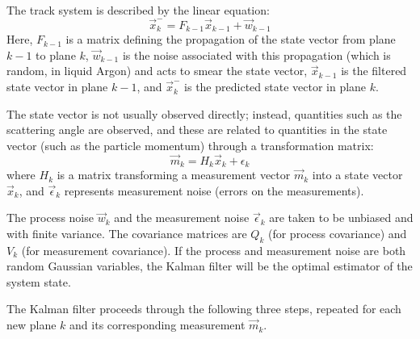 The track system is described by the linear equation:
\begin{equation}\label{eqn:kalman_track_system}
    \vec{x}_k^{-} = F_{k-1} \vec{x}_{k-1} + \vec{w}_{k-1}
\end{equation}
Here, $F_{k-1}$ is a matrix defining the propagation of the state vector from plane $k-1$ to plane $k$, $\vec{w}_{k-1}$ is the noise associated with this propagation (which is random, in liquid Argon) and acts to smear the state vector, $\vec{x}_{k-1}$ is the filtered state vector in plane $k-1$, and $\vec{x}_k^{-}$ is the predicted state vector in plane $k$.

The state vector is not usually observed directly; instead, quantities such as the scattering angle are observed, and these are related to quantities in the state vector (such as the particle momentum) through a transformation matrix:
\begin{equation}\label{eqn:kalman_measurement_equation}
    \vec{m}_k = H_k \vec{x}_k + \epsilon_k
\end{equation}
where $H_k$ is a matrix transforming a measurement vector $\vec{m}_k$ into a state vector $\vec{x}_k$, and $\vec{\epsilon}_k$ represents measurement noise (errors on the measurements).

The process noise $\vec{w}_k$ and the measurement noise $\vec{\epsilon}_k$ are taken to be unbiased and with finite variance. The covariance matrices are $Q_k$ (for process covariance) and $V_k$ (for measurement covariance). If the process and measurement noise are both random Gaussian variables, the Kalman filter will be the optimal estimator of the system state.

The Kalman filter proceeds through the following three steps, repeated for each new plane $k$ and its corresponding measurement $\vec{m}_k$.

